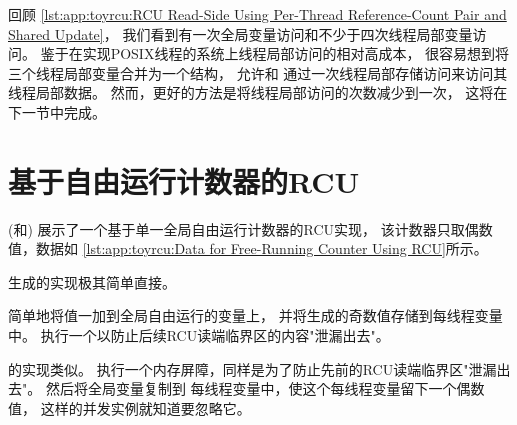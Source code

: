 \QuickQuizEnd

回顾
\cref{lst:app:toyrcu:RCU Read-Side Using Per-Thread Reference-Count Pair and Shared Update}，
我们看到有一次全局变量访问和不少于四次线程局部变量访问。
鉴于在实现POSIX线程的系统上线程局部访问的相对高成本，
很容易想到将三个线程局部变量合并为一个结构，
允许和
通过一次线程局部存储访问来访问其线程局部数据。
然而，更好的方法是将线程局部访问的次数减少到一次，
这将在下一节中完成。

\section{基于自由运行计数器的RCU}
\label{sec:app:toyrcu:RCU Based on Free-Running Counter}

(和)
展示了一个基于单一全局自由运行计数器的RCU实现，
该计数器只取偶数值，数据如
\cref{lst:app:toyrcu:Data for Free-Running Counter Using RCU}所示。

\begin{listing}

\caption{使用自由运行计数器的RCU数据}
\label{lst:app:toyrcu:Data for Free-Running Counter Using RCU}
\end{listing}

\begin{listing}
\vspace*{-11pt}
\caption{使用自由运行计数器的RCU}
\label{lst:app:toyrcu:Free-Running Counter Using RCU}
\end{listing}

生成的实现极其简单直接。
\begin{fcvref}
简单地将值一加到全局自由运行的变量上，
并将生成的奇数值存储到每线程变量中。
执行一个以防止后续RCU读端临界区的内容"泄漏出去"。
\end{fcvref}

\begin{fcvref}
的实现类似。
执行一个内存屏障，同样是为了防止先前的RCU读端临界区"泄漏出去"。
然后将全局变量复制到
每线程变量中，使这个每线程变量留下一个偶数值，
这样的并发实例就知道要忽略它。
\end{fcvref}

